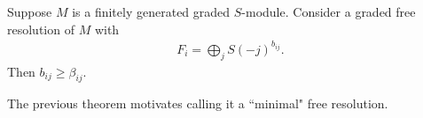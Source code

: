 \begin{theorem}
    Suppose $M$ is a finitely generated graded $S$-module. Consider a graded free resolution of $M$ with
    \begin{align*}
        F_i = \bigoplus_j S(-j)^{b_{i j}}.
    \end{align*}
    Then $b_{ij} \geq \beta_{ij}$.
\end{theorem}

The previous theorem motivates calling it a ``minimal" free resolution.
